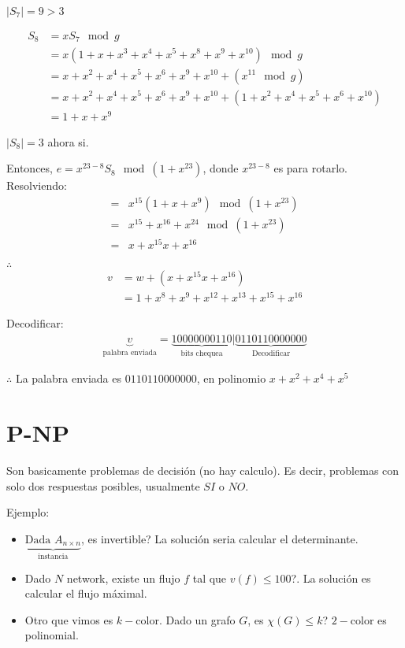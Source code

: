\documentclass[12pt,a4paper]{article}
\begin{document}
$|S_{7}| = 9 > 3$

\begin{align*}
    S_{8} &= x S_{7} \mod g\\
    &= x (1 + x + x^{3} + x^{4} + x^{5} + x^{8} + x^{9} + x^{10}) \mod g\\
    &= x + x^{2} + x^{4} + x^{5} + x^{6} + x^{9} + x^{10} + (x^{11} \mod g)\\
    &= x + x^{2} + x^{4} + x^{5} + x^{6} + x^{9} + x^{10} + (1 + x^{2} + x^{4} + x^{5} + x^{6} + x^{10})\\
    &= 1 + x + x^{9}
\end{align*}

$|S_{8}| = 3$ ahora si.
\medskip

Entonces, $e = x^{23-8} S_{8} \mod (1+x^{23})$, donde $x^{23-8}$ es para rotarlo. Resolviendo:
\begin{align*}
    =& x^{15} (1 + x + x^{9}) \mod (1+x^{23})\\
    =& x^{15} + x^{16} + x^{24} \mod (1+x^{23})\\
    =& x + x^{15} x + x^{16} 
\end{align*}

$\therefore$ 
\begin{align*}
    v &= w + (x + x^{15} x + x^{16})\\
    &= 1 + x^{8} + x^{9} + x^{12} + x^{13} + x^{15} + x^{16} 
\end{align*}

Decodificar:
\begin{align*}
    \underbrace{v}_{\text{palabra enviada}} = \underbrace{10000000110}_{\text{bits chequea}}|\underbrace{0110110000000}_{\text{Decodificar}}
\end{align*}

$\therefore$ La palabra enviada es $0110110000000$, en polinomio $x+x^{2}+x^{4}+x^{5}$

\section{P-NP}

Son basicamente problemas de decisión (no hay calculo). Es decir, problemas con 
solo dos respuestas posibles, usualmente $SI$ o $NO$.
\medskip

Ejemplo:
\begin{itemize}
    \item $\underbrace{\text{Dada}\,\, A_{n\times n}}_{\text{instancia}}$, es invertible?
        La solución seria calcular el determinante.
    \item Dado $N$ network, existe un flujo $f$ tal que $v(f) \leq 100$?.
        La solución es calcular el flujo máximal.
    \item Otro que vimos es $k-$color. Dado un grafo $G$, es $\chi (G) \leq k$?
        $2-$color es polinomial.
\end{itemize}
\end{document}
